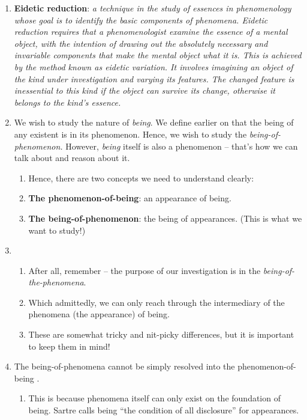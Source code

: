 \begin{enumerate}
  \item \textbf{Eidetic reduction}: \emph{a technique in the study of essences in phenomenology whose goal is to identify the basic components of phenomena. Eidetic reduction requires that a phenomenologist examine the essence of a mental object, with the intention of drawing out the absolutely necessary and invariable components that make the mental object what it is. This is achieved by the method known as eidetic variation.
  It involves imagining an object of the kind under investigation and varying its features. The changed feature is inessential to this kind if the object can survive its change, otherwise it belongs to the kind's essence.}
  \item We wish to study the nature of \emph{being}. We define earlier on that the being of any existent is in its phenomenon. Hence, we wish to study the \emph{being-of-phenomenon.} However, \emph{being} itself is also a phenomenon -- that's how we can talk about and reason about it.  \begin{enumerate}
    \item Hence, there are two concepts we need to understand clearly:
    \item \textbf{The phenomenon-of-being}: an appearance of being.
    \item \textbf{The being-of-phenomenon}: the being of appearances. (This is what we want to study!)
  \end{enumerate}
  \item {}
  \begin{enumerate}
    \item After all, remember -- the purpose of our investigation is in the \emph{being-of-the-phenomena}.
    \item Which admittedly, we can only reach through the intermediary of the phenomena (the appearance) of being.
    \item These are somewhat tricky and nit-picky differences, but it is important to keep them in mind!
  \end{enumerate}
  \item The being-of-phenomena cannot be simply resolved into the phenomenon-of-being \autocite[7]{sartre}.
  \begin{enumerate}
    \item This is because phenomena itself can only exist on the foundation of being. Sartre calls being \enquote{the condition of all disclosure} for appearances.

\end{enumerate}
\end{enumerate}
